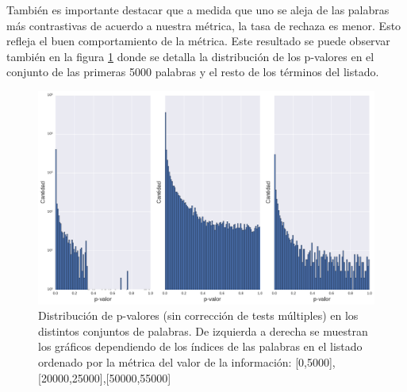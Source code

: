 También es importante destacar que a medida que uno se aleja de las palabras más contrastivas de acuerdo a nuestra métrica, la tasa de rechaza es menor. Esto refleja el buen comportamiento de la métrica. Este resultado se puede observar también en la figura \ref{fig:pvalores_sinBonferroni} donde se detalla la distribución de los p-valores en el conjunto de las primeras 5000 palabras y el resto de los términos del listado.

\begin{figure}[!ht]\centering
  
    \includegraphics[width=\linewidth]{./images/pvalores_sinBonferroni.pdf}
    \caption{Distribución de p-valores (sin corrección de tests múltiples) en los distintos conjuntos de palabras. De izquierda a derecha se muestran los gráficos dependiendo de los índices de las palabras en el listado ordenado por la métrica del valor de la información: [0,5000], [20000,25000],[50000,55000]} 
    \label{fig:pvalores_sinBonferroni} 

\end{figure}

